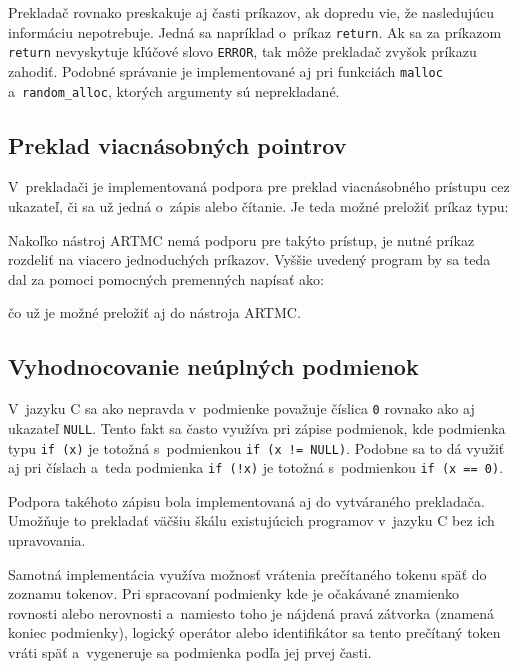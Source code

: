 Prekladač rovnako preskakuje aj časti príkazov, ak dopredu vie, že nasledujúcu informáciu nepotrebuje. Jedná sa napríklad o~príkaz \texttt{return}. Ak sa za príkazom \texttt{return} nevyskytuje kľúčové slovo \texttt{ERROR}, tak môže prekladač zvyšok príkazu zahodiť. Podobné správanie je implementované aj pri funkciách \texttt{malloc} a~\texttt{random\_alloc}, ktorých argumenty sú neprekladané.
\newpage

\subsection{Preklad viacnásobných pointrov}
V~prekladači je implementovaná podpora pre preklad viacnásobného prístupu cez ukazateľ, či sa už jedná o~zápis alebo čítanie. Je teda možné preložiť príkaz typu:


\noindent
Nakoľko nástroj ARTMC nemá podporu pre takýto prístup, je nutné príkaz rozdeliť na viacero jednoduchých príkazov. Vyššie uvedený program by sa teda dal za pomoci pomocných premenných napísať ako:


\noindent
čo už je možné preložiť aj do nástroja ARTMC.

\subsection{Vyhodnocovanie neúplných podmienok}
V~jazyku C sa ako nepravda v~podmienke považuje číslica \texttt{0} rovnako ako aj ukazateľ \texttt{NULL}. Tento fakt sa často využíva pri zápise podmienok, kde podmienka typu \texttt{if (x)} je totožná s~podmienkou \texttt{if (x != NULL)}. Podobne sa to dá využiť aj pri číslach a~teda podmienka \texttt{if (!x)} je totožná s~podmienkou \texttt{if (x == 0)}.

Podpora takéhoto zápisu bola implementovaná aj do vytváraného prekladača. Umožňuje to prekladať väčšiu škálu existujúcich programov v~jazyku C bez ich upravovania.

Samotná implementácia využíva možnosť vrátenia prečítaného tokenu späť do zoznamu tokenov. Pri spracovaní podmienky kde je očakávané znamienko rovnosti alebo nerovnosti a~namiesto toho je nájdená pravá zátvorka (znamená koniec podmienky), logický operátor alebo identifikátor sa tento prečítaný token vráti späť a~vygeneruje sa podmienka podľa jej prvej časti.

